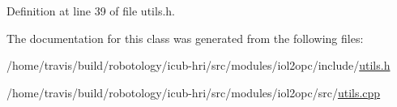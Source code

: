 Definition at line 39 of file utils.\+h.



The documentation for this class was generated from the following files\+:\begin{DoxyCompactItemize}
\item 
/home/travis/build/robotology/icub-\/hri/src/modules/iol2opc/include/\hyperlink{utils_8h}{utils.\+h}\item 
/home/travis/build/robotology/icub-\/hri/src/modules/iol2opc/src/\hyperlink{utils_8cpp}{utils.\+cpp}\end{DoxyCompactItemize}
